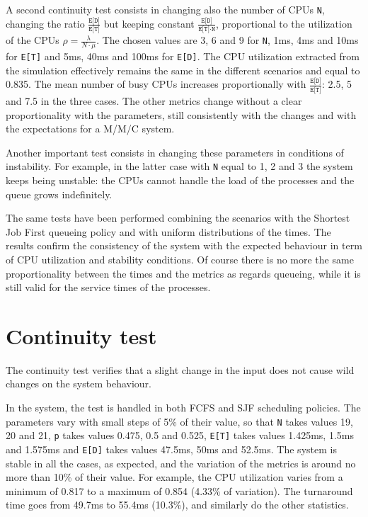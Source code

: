A second continuity test consists in changing also the number of CPUs \texttt{N},
changing the ratio $\frac{\texttt{E[D]}}{\texttt{E[T]}}$ but keeping constant
$\frac{\texttt{E[D]}}{\texttt{E[T]}\cdot \texttt{N}}$, proportional to the
utilization of the CPUs $\rho=\frac{\lambda}{N\cdot \mu}$. The chosen values
are 3, 6 and 9 for \texttt{N}, 1ms, 4ms and 10ms for \texttt{E[T]} and 
5ms, 40ms and 100ms for \texttt{E[D]}. The CPU utilization extracted from
the simulation effectively remains the same in the different scenarios and equal
to 0.835. The mean number of busy CPUs increases proportionally with
$\frac{\texttt{E[D]}}{\texttt{E[T]}}$: 2.5, 5 and 7.5 in the three cases. The other 
metrics change without a clear proportionality with the parameters, still consistently 
with the changes and with the expectations for a M/M/C system.

Another important test consists in changing these parameters in conditions
of instability. For example, in the latter case with \texttt{N} equal to 1, 2 and 3
the system keeps being unstable: the CPUs cannot handle the load of
the processes and the queue grows indefinitely.

The same tests have been performed combining the scenarios with the Shortest 
Job First queueing policy and with uniform distributions of the times. The results
confirm the consistency of the system with the expected behaviour in term of
CPU utilization and stability conditions. Of course there is no more the same
proportionality between the times and the metrics as regards queueing, while it 
is still valid for the service times of the processes.

\section{Continuity test}
The continuity test verifies that a slight change in the input does not 
cause wild changes on the system behaviour.

In the system, the test is handled in both FCFS and SJF scheduling policies.
The parameters vary with small steps of 5\% of their value, so that 
\texttt{N} takes values 19, 20 and 21, \texttt{p} takes values 0.475, 0.5 and 0.525,
\texttt{E[T]} takes values 1.425ms, 1.5ms and 1.575ms and \texttt{E[D]} takes values
47.5ms, 50ms and 52.5ms. The system is stable in all the cases, as expected,
and the variation of the metrics is around no more than 10\% of their value. For
example, the CPU utilization varies from a minimum of 0.817 to a maximum of 0.854 (4.33\% of variation).
The turnaround time goes from 49.7ms to 55.4ms (10.3\%), and similarly do the other
statistics.


